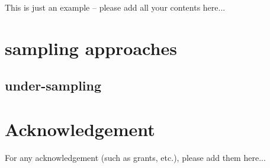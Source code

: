 \documentclass{wileySix}
\begin{document}
This is just an example -- please add all your contents here...


\section{sampling approaches}

\subsection{under-sampling}

\section{Acknowledgement}

For any acknowledgement (such as grants, etc.), please add them here...




\end{document}
